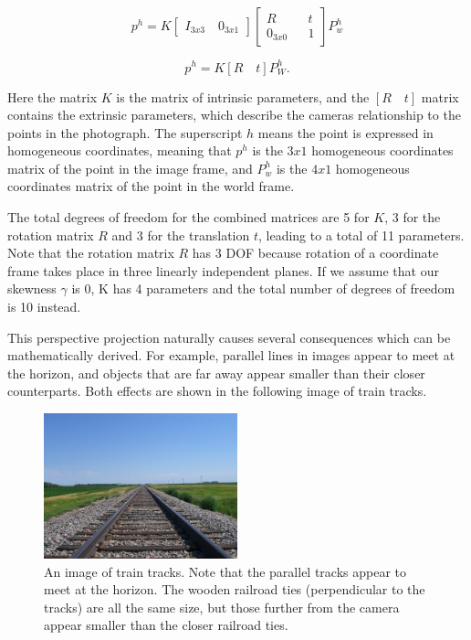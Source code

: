 \documentclass[]{article}
\begin{document}
 \begin{equation}
p^h
=
K \begin{bmatrix}
I_{3x3} \quad 0_{3x1}
\end{bmatrix}
\begin{bmatrix}
R && t \\
0_{3x0} && 1
\end{bmatrix}
P_w^h
 \end{equation}

 \begin{equation}
 p^h = K[R \quad t] P_W^h.
 \end{equation}

Here the matrix $K$ is the matrix of intrinsic parameters, and the $[R \quad t]$ matrix contains the extrinsic parameters, which describe the cameras relationship to the points in the photograph. The superscript $h$ means the point is expressed in homogeneous coordinates, meaning that $p^h$ is the $3x1$ homogeneous coordinates matrix of the point in the image frame, and $P_w^h$ is the $4x1$ homogeneous coordinates matrix of the point in the world frame.

The total degrees of freedom for the combined matrices are 5 for $K$, 3 for the rotation matrix $R$ and 3 for the translation $t$, leading to a total of 11 parameters. Note that the rotation matrix $R$ has 3 DOF because rotation of a coordinate frame takes place in three linearly independent planes. If we assume that our skewness $\gamma$ is 0, K has 4 parameters and the total number of degrees of freedom is 10 instead.

This perspective projection naturally causes several consequences which can be mathematically derived. For example, parallel lines in images appear to meet at the horizon, and objects that are far away appear smaller than their closer counterparts. Both effects are shown in the following image of train tracks.

\begin{figure}[H]
\includegraphics[width=0.5\textwidth]{traintracks.jpg}
\centering
\caption{An image of train tracks. Note that the parallel tracks appear to meet at the horizon. The wooden railroad ties (perpendicular to the tracks) are all the same size, but those further from the camera appear smaller than the closer railroad ties. }
\label{fig:train_tracks}
\end{figure}
\end{document}
